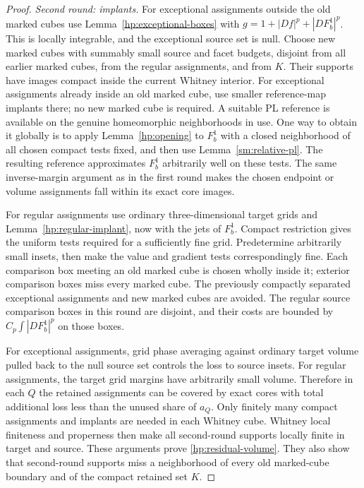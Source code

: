 \documentclass[11pt]{article}
\numberwithin{equation}{section}
\theoremstyle{definition}
\theoremstyle{remark}
\begin{document}
\begin{proof}
\emph{Second round: implants.}
For exceptional assignments outside the old marked cubes use
Lemma~\ref{hp:exceptional-boxes} with
$g=1+|Df|^p+|DF_b^1|^p$.  This is locally integrable, and the
exceptional source set is null.  Choose new marked cubes with
summably small source and facet budgets, disjoint from all earlier
marked cubes, from the regular assignments, and from $K$.  Their
supports have images compact inside the current Whitney interior.
For exceptional assignments already inside an old marked cube,
use smaller reference-map implants there; no new marked cube is
required.  A suitable PL reference is available on the genuine
homeomorphic neighborhoods in use.  One way to obtain it globally
is to apply Lemma~\ref{hp:opening} to $F_b^1$ with a closed
neighborhood of all chosen compact tests fixed, and then use
Lemma~\ref{sm:relative-pl}.  The resulting reference approximates
$F_b^1$ arbitrarily well on these tests.  The same inverse-margin
argument as in the first round makes the chosen endpoint or volume
assignments fall within its exact core images.

For regular assignments use ordinary three-dimensional target grids
and Lemma~\ref{hp:regular-implant}, now with the jets of $F_b^1$.
Compact restriction gives the uniform tests required for a sufficiently
fine grid.  Predetermine arbitrarily small insets, then make the
value and gradient tests correspondingly fine.  Each comparison box
meeting an old marked cube is chosen wholly inside it; exterior
comparison boxes miss every marked cube.  The previously compactly
separated exceptional assignments and new marked cubes are avoided.
The regular source comparison boxes in this round are disjoint, and
their costs are bounded by $C_p\int|DF_b^1|^p$ on those boxes.

For exceptional assignments, grid phase averaging against ordinary
target volume pulled back to the null source set controls the loss
to source insets.  For regular assignments, the target grid margins
have arbitrarily small volume.  Therefore in each $Q$ the retained
assignments can be covered by exact cores with total additional
loss less than the unused share of $a_Q$.  Only finitely many compact
assignments and implants are needed in each Whitney cube.  Whitney
local finiteness and properness then make all second-round supports
locally finite in target and source.  These arguments prove
\eqref{hp:residual-volume}.  They also show that second-round
supports miss a neighborhood of every old marked-cube boundary and
of the compact retained set $K$.


\end{proof}
\end{document}
